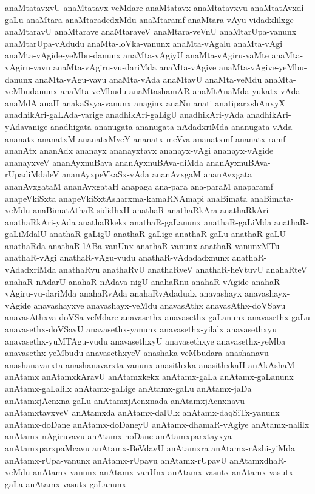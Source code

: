 {anaMtatavxvU
anaMtatavx-veMdare
anaMtatavx
anaMtatavxvu
anaMtatAvxdi-gaLu
anaMtara
anaMtaradedxMdu
anaMtaramf
anaMtara-vAyu-vidadxlilxge
anaMtaravU
anaMtarave
anaMtaraveV
anaMtara-veVnU
anaMtarUpa-vanunx
anaMtarUpa-vAdudu
anaMta-loVka-vanunx
anaMta-vAgalu
anaMta-vAgi
anaMta-vAgide-yeMbu-danunx
anaMta-vAgiyU
anaMta-vAgiru-vaMte
anaMta-vAgiru-vavu
anaMta-vAgiru-vu-dariMda
anaMta-vAgive
anaMta-vAgive-yeMbu-danunx
anaMta-vAgu-vavu
anaMta-vAda
anaMtavU
anaMta-veMdu
anaMta-veMbudanunx
anaMta-veMbudu
anaMtashamAR
anaMtAnaMda-yukatx-vAda
anaMdA
anaH
anakaSxya-vanunx
anaginx
anaNu
anati
anatiparxshAnxyX
anadhikAri-gaLAda-varige
anadhikAri-gaLigU
anadhikAri-yAda
anadhikAri-yAdavanige
anadhigata
ananugata
ananugata-nAdadxriMda
ananugata-vAda
ananatx
ananatxM
ananatxMveY
ananatx-meVva
ananatxmf
ananatx-ramf
ananAtx
ananAdx
ananayx
ananayxtavx
ananayx-vAgi
ananayx-vAgide
ananayxveV
ananAyxnuBava
ananAyxnuBAva-diMda
ananAyxnuBAva-rUpadiMdaleV
ananAyxpeVkaSx-vAda
ananAvxgaM
ananAvxgata
ananAvxgataM
ananAvxgataH
anapaga
ana-para
ana-paraM
anaparamf
anapeVkiSxta
anapeVkiSxtAsharxma-kamaRNAmapi
anaBimata
anaBimata-veMdu
anaBimatAthaR-sididhxH
anathaR
anathaRkAra
anathaRkAri
anathaRkAri-yAda
anathaRkekx
anathaR-gaLanunx
anathaR-gaLiMda
anathaR-gaLiMdalU
anathaR-gaLigU
anathaR-gaLige
anathaR-gaLu
anathaR-gaLU
anathaRda
anathaR-lABa-vanUnx
anathaR-vanunx
anathaR-vanunxMTu
anathaR-vAgi
anathaR-vAgu-vudu
anathaR-vAdadadxnunx
anathaR-vAdadxriMda
anathaRvu
anathaRvU
anathaRveV
anathaR-heVtuvU
anahaRteV
anahaR-nAdarU
anahaR-nAdava-nigU
anahaRnu
anahaR-vAgide
anahaR-vAgiru-vu-dariMda
anahaRvAda
anahaRvAdadudx
anavashayx
anavashayx-vAgide
anavashayxve
anavashayx-veMdu
anavasAthx
anavasAthx-doVSavu
anavasAthxva-doVSa-veMdare
anavasethx
anavasethx-gaLanunx
anavasethx-gaLu
anavasethx-doVSavU
anavasethx-yanunx
anavasethx-yilalx
anavasethxyu
anavasethx-yuMTAgu-vudu
anavasethxyU
anavasethxye
anavasethx-yeMba
anavasethx-yeMbudu
anavasethxyeV
anashaka-veMbudara
anashanavu
anashanavarxta
anashanavarxta-vanunx
anasithxka
anasithxkaH
anAkAshaM
anAtamx
anAtamxkAravU
anAtamxkekx
anAtamx-gaLa
anAtamx-gaLanunx
anAtamx-gaLalilx
anAtamx-gaLige
anAtamx-gaLu
anAtamx-jaDa
anAtamxjAcnxna-gaLu
anAtamxjAcnxnada
anAtamxjAcnxnavu
anAtamxtavxveV
anAtamxda
anAtamx-dalUlx
anAtamx-daqSiTx-yanunx
anAtamx-doDane
anAtamx-doDaneyU
anAtamx-dhamaR-vAgiye
anAtamx-nalilx
anAtamx-nAgiruvavu
anAtamx-noDane
anAtamxparxtayxya
anAtamxparxpaMcavu
anAtamx-BeVdavU
anAtamxra
anAtamx-rAshi-yiMda
anAtamx-rUpa-vanunx
anAtamx-rUpavu
anAtamx-rUpavU
anAtamxdhaR-veMdu
anAtamx-vanunx
anAtamx-vanUnx
anAtamx-vasutx
anAtamx-vasutx-gaLa
anAtamx-vasutx-gaLanunx
}
